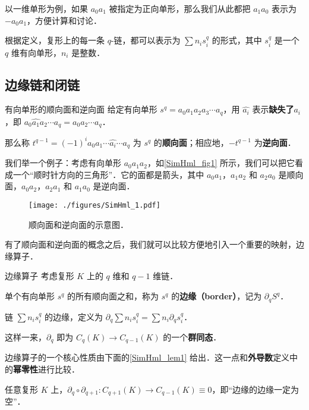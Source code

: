 以一维单形为例，如果 $a_0a_1$ 被指定为正向单形，那么我们从此都把 $a_1a_0$ 表示为 $-a_0a_1$，方便计算和讨论．

根据定义，复形上的每一条 $q$-链，都可以表示为 $\sum n_is^q_i$ 的形式，其中 $s^q_i$ 是一个 $q$ 维有向单形，$n_i$ 是整数．

\subsection{边缘链和闭链}

\begin{definition}{有向单形的顺向面和逆向面}
给定有向单形 $s^q=a_0a_1a_2a_3\cdots a_q$，用 $\hat{a_i}$ 表示\textbf{缺失了}$a_i$，即 $a_0\hat{a_1}a_2\cdots a_q=a_0a_2\cdots a_q$．

那么称 $t^{q-1}=(-1)^ia_0a_1\cdots\hat{a_i}\cdots a_q$ 为 $s^q$ 的\textbf{顺向面}；相应地，$-t^{q-1}$ 为\textbf{逆向面}．
\end{definition}

我们举一个例子：考虑有向单形 $a_0a_1a_2$，如\autoref{SimHml_fig1} 所示，我们可以把它看成一个“顺时针方向的三角形”．它的面都是箭头，其中 $a_0a_1$，$a_1a_2$ 和 $a_2a_0$ 是顺向面，$a_0a_2$，$a_2a_1$ 和 $a_1a_0$ 是逆向面．

\begin{figure}[ht]
\centering
\texttt{[image: ./figures/SimHml\_1.pdf]}
\caption{顺向面和逆向面的示意图．} \label{SimHml_fig1}
\end{figure}

有了顺向面和逆向面的概念之后，我们就可以比较方便地引入一个重要的映射，边缘算子．

\begin{definition}{边缘算子}
考虑复形 $K$ 上的 $q$ 维和 $q-1$ 维链．

单个有向单形 $s^q$ 的所有顺向面之和，称为 $s^q$ 的\textbf{边缘（border）}，记为 $\partial_q S^q$．

链 $\sum n_is^q_i$ 的边缘，定义为 $\partial_q \sum n_is^q_i=\sum n_i\partial_qs^q_i$．

这样一来，$\partial_q$ 即为 $C_q(K)\to C_{q-1}(K)$ 的一个\textbf{群同态}．
\end{definition}

边缘算子的一个核心性质由下面的\autoref{SimHml_lem1} 给出．这一点和\textbf{外导数}定义中的\textbf{幂零性}进行比较．

\begin{lemma}{}\label{SimHml_lem1}
任意复形 $K$ 上，$\partial_q\circ\partial_{q+1}:C_{q+1}(K)\to C_{q-1}(K)\equiv 0$，即“边缘的边缘一定为空”．
\end{lemma}

